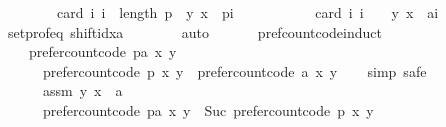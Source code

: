 \begin{isabellebody}
\ \ \ \ \ \ \ \ card\ {\isacharbraceleft}{\kern0pt}i{\isachardot}{\kern0pt}\ i\ {\isacharless}{\kern0pt}\ length\ p\ {\isasymand}\ {\isacharparenleft}{\kern0pt}y{\isacharcomma}{\kern0pt}\ x{\isacharparenright}{\kern0pt}\ {\isasymin}\ p{\isacharbang}{\kern0pt}i{\isacharbraceright}{\kern0pt}\ {\isacharplus}{\kern0pt}\isanewline
\ \ \ \ \ \ \ \ \ \ card\ {\isacharbraceleft}{\kern0pt}i{\isachardot}{\kern0pt}\ i\ {\isacharequal}{\kern0pt}\ {}\ {\isasymand}\ {\isacharparenleft}{\kern0pt}y{\isacharcomma}{\kern0pt}\ x{\isacharparenright}{\kern0pt}\ {\isasymin}\ {\isacharbrackleft}{\kern0pt}a{\isacharbrackright}{\kern0pt}{\isacharbang}{\kern0pt}i{\isacharbraceright}{\kern0pt}{\isachardoublequoteclose}\isanewline
\ \ \ \ \ \ \isamarkupfalse%
\ set{\isacharunderscore}{\kern0pt}prof{\isacharunderscore}{\kern0pt}eq\ shift{\isacharunderscore}{\kern0pt}idx{\isacharunderscore}{\kern0pt}a\isanewline
\ \ \ \ \ \ \isamarkupfalse%
\ auto\isanewline
\ \ \isamarkupfalse%
\isanewline
\ \ \isamarkupfalse%
\ pref{\isacharunderscore}{\kern0pt}count{\isacharunderscore}{\kern0pt}code{\isacharunderscore}{\kern0pt}induct{\isacharcolon}{\kern0pt}\isanewline
\ \ \ \ {\isachardoublequoteopen}prefer{\isacharunderscore}{\kern0pt}count{\isacharunderscore}{\kern0pt}code\ {\isacharparenleft}{\kern0pt}p{\isacharat}{\kern0pt}{\isacharbrackleft}{\kern0pt}a{\isacharbrackright}{\kern0pt}{\isacharparenright}{\kern0pt}\ x\ y\ {\isacharequal}{\kern0pt}\isanewline
\ \ \ \ \ \ prefer{\isacharunderscore}{\kern0pt}count{\isacharunderscore}{\kern0pt}code\ p\ x\ y\ {\isacharplus}{\kern0pt}\ prefer{\isacharunderscore}{\kern0pt}count{\isacharunderscore}{\kern0pt}code\ {\isacharbrackleft}{\kern0pt}a{\isacharbrackright}{\kern0pt}\ x\ y{\isachardoublequoteclose}\isanewline
\ \ \isamarkupfalse%
\ {\isacharparenleft}{\kern0pt}simp{\isacharcomma}{\kern0pt}\ safe{\isacharparenright}{\kern0pt}\isanewline
\ \ \ \ \isamarkupfalse%
\isanewline
\ \ \ \ \ \ assm{\isacharcolon}{\kern0pt}\ {\isachardoublequoteopen}{\isacharparenleft}{\kern0pt}y{\isacharcomma}{\kern0pt}\ x{\isacharparenright}{\kern0pt}\ {\isasymin}\ a{\isachardoublequoteclose}\isanewline
\ \ \ \ \isamarkupfalse%
\isanewline
\ \ \ \ \ \ {\isachardoublequoteopen}prefer{\isacharunderscore}{\kern0pt}count{\isacharunderscore}{\kern0pt}code\ {\isacharparenleft}{\kern0pt}p{\isacharat}{\kern0pt}{\isacharbrackleft}{\kern0pt}a{\isacharbrackright}{\kern0pt}{\isacharparenright}{\kern0pt}\ x\ y\ {\isacharequal}{\kern0pt}\ Suc\ {\isacharparenleft}{\kern0pt}prefer{\isacharunderscore}{\kern0pt}count{\isacharunderscore}{\kern0pt}code\ p\ x\ y{\isacharparenright}{\kern0pt}{\isachardoublequoteclose}\isanewline

\end{isabellebody}
